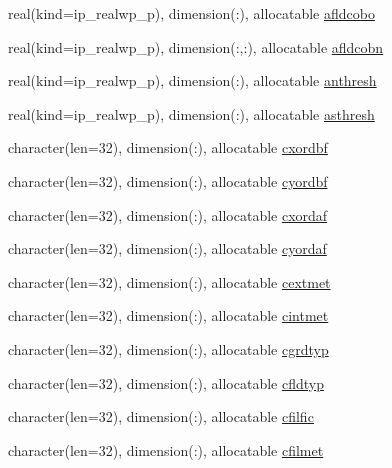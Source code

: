 \begin{DoxyCompactItemize}
\item 
real(kind=ip\+\_\+realwp\+\_\+p), dimension(\+:), allocatable \hyperlink{namespacemod__oasis__namcouple_aa9d178659282698ffb6c186ff48bed3c}{afldcobo}
\item 
real(kind=ip\+\_\+realwp\+\_\+p), dimension(\+:,\+:), allocatable \hyperlink{namespacemod__oasis__namcouple_a8f9d02a3ec2e9e46742d6c6073b39199}{afldcobn}
\item 
real(kind=ip\+\_\+realwp\+\_\+p), dimension(\+:), allocatable \hyperlink{namespacemod__oasis__namcouple_ae61173ac38ba4ae398fb0d4bef686f7d}{anthresh}
\item 
real(kind=ip\+\_\+realwp\+\_\+p), dimension(\+:), allocatable \hyperlink{namespacemod__oasis__namcouple_a3e5d6e25f3a6b976b50b3c26f610f41a}{asthresh}
\item 
character(len=32), dimension(\+:), allocatable \hyperlink{namespacemod__oasis__namcouple_a047e7be9411842edfe8326ba22d3e92d}{cxordbf}
\item 
character(len=32), dimension(\+:), allocatable \hyperlink{namespacemod__oasis__namcouple_a704f4d4aef4d10f10c668e7eea404480}{cyordbf}
\item 
character(len=32), dimension(\+:), allocatable \hyperlink{namespacemod__oasis__namcouple_a5d93e0a5d832f73e9cc9d811d82342a0}{cxordaf}
\item 
character(len=32), dimension(\+:), allocatable \hyperlink{namespacemod__oasis__namcouple_a6af7c46f2c920cf3a64eaa879e193351}{cyordaf}
\item 
character(len=32), dimension(\+:), allocatable \hyperlink{namespacemod__oasis__namcouple_aca9e7961bb0caa6d66fb6e4ea3b78fa9}{cextmet}
\item 
character(len=32), dimension(\+:), allocatable \hyperlink{namespacemod__oasis__namcouple_a46b91a5afb3ade08bc72832fca0b6459}{cintmet}
\item 
character(len=32), dimension(\+:), allocatable \hyperlink{namespacemod__oasis__namcouple_af696efdbc59af586a6f3ffe4acb19c17}{cgrdtyp}
\item 
character(len=32), dimension(\+:), allocatable \hyperlink{namespacemod__oasis__namcouple_a28927100ad1c6c0a4206fb6026286f2a}{cfldtyp}
\item 
character(len=32), dimension(\+:), allocatable \hyperlink{namespacemod__oasis__namcouple_a10f5e54ac2bf61f604faa422a748724f}{cfilfic}
\item 
character(len=32), dimension(\+:), allocatable \hyperlink{namespacemod__oasis__namcouple_ab97dbc120a10a399af30114b8112271d}{cfilmet}
\item 

\end{DoxyCompactItemize}
